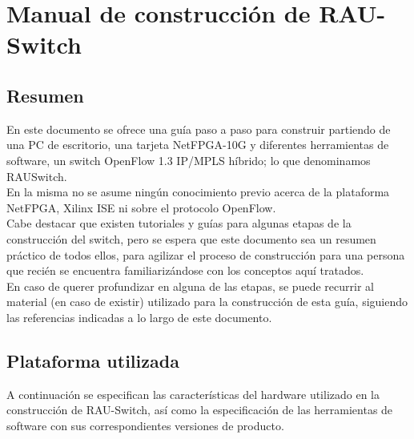 
\chapter{Manual de construcción de RAU-Switch}

\ifpdf
    \graphicspath{{Anexo1/Figs/Raster/}{Anexo1/Figs/PDF/}{Anexo1/Figs/}}
\else
    \graphicspath{{Anexo1/Figs/Vector/}{Anexo1/Figs/}}
\fi



\section{Resumen}

En este documento se ofrece una guía paso a paso para construir partiendo de una PC de escritorio, una tarjeta NetFPGA-10G y diferentes herramientas de software, un switch OpenFlow 1.3 IP/MPLS híbrido; lo que denominamos RAUSwitch.\\

En la misma no se asume ningún conocimiento previo acerca de la plataforma NetFPGA, Xilinx ISE ni sobre el protocolo OpenFlow.\\

Cabe destacar que existen tutoriales y guías para algunas etapas de la construcción del switch, pero se espera que este documento sea un resumen práctico de todos ellos, para agilizar el proceso de construcción para una persona que recién se encuentra familiarizándose con los conceptos aquí tratados.\\

En caso de querer profundizar en alguna de las etapas, se puede recurrir al material (en caso de existir) utilizado para la construcci\'on de esta gu\'ia, siguiendo las referencias indicadas a lo largo de este documento.


\section{Plataforma utilizada}
\label{annexI.1}
A continuación se especifican las caracter\'isticas del hardware utilizado en la construcci\'on de RAU-Switch, as\'i como la especificaci\'on de las herramientas de software con sus correspondientes versiones de producto.
 
